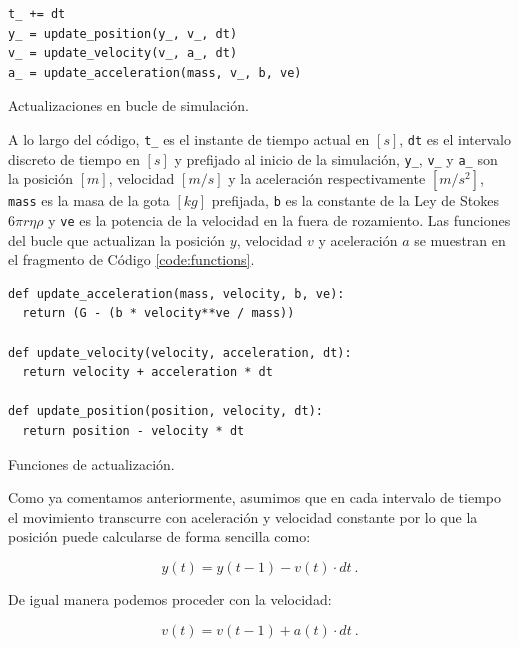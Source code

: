 \documentclass[journal]{IEEEtran}
\newenvironment{code}{\captionsetup{type=listing}}{\par\addvspace{\baselineskip}}
\begin{document}
\bigskip

\begin{code}
  \begin{verbatim}
t_ += dt
y_ = update_position(y_, v_, dt)
v_ = update_velocity(v_, a_, dt)
a_ = update_acceleration(mass, v_, b, ve)
  \end{verbatim}
  \caption{Actualizaciones en bucle de simulación.}
  \label{code:bucle}
\end{code}

A lo largo del código, \texttt{t_} es el instante de tiempo actual en $[s]$, \texttt{dt} es el intervalo discreto de tiempo en $[s]$ y prefijado al inicio de la simulación, \texttt{y_}, \texttt{v_} y \texttt{a_} son la posición $[m]$, velocidad $[m/s]$ y la aceleración respectivamente $[m/s^2]$, \texttt{mass} es la masa de la gota $[kg]$ prefijada, \texttt{b} es la constante de la Ley de Stokes
$6\pi r\eta\rho$ y \texttt{ve} es la potencia de la velocidad en la fuera de rozamiento. Las funciones del bucle que actualizan la posición $y$, velocidad $v$ y aceleración $a$ se muestran en el fragmento de Código \ref{code:functions}.

\bigskip

\begin{code}
	\begin{verbatim}
def update_acceleration(mass, velocity, b, ve):
  return (G - (b * velocity**ve / mass))

def update_velocity(velocity, acceleration, dt):
  return velocity + acceleration * dt

def update_position(position, velocity, dt):
  return position - velocity * dt
	\end{verbatim}
  \caption{Funciones de actualización.}
  \label{code:functions}
\end{code}

Como ya comentamos anteriormente, asumimos que en cada intervalo de tiempo el movimiento transcurre con aceleración y velocidad constante por lo que la posición puede calcularse de forma sencilla como:

\begin{equation}
  y(t) = y(t-1) - v(t) \cdot dt~.
\end{equation}

De igual manera podemos proceder con la velocidad:

\begin{equation}
  v(t) = v(t-1) + a(t) \cdot dt~.
\end{equation}
\end{document}
